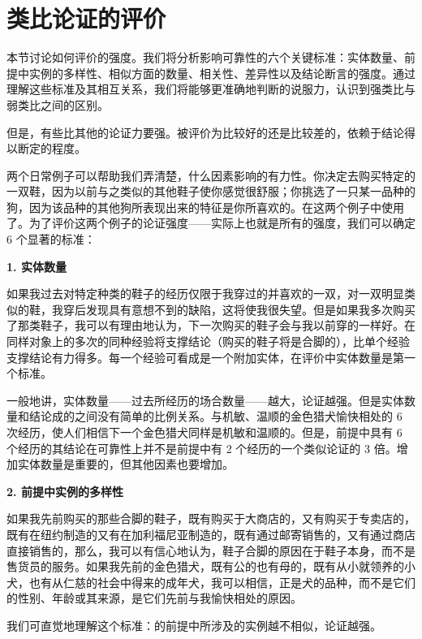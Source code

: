 \section{类比论证的评价}

\begin{logicbox}[title=引言]
本节讨论如何评价的强度。我们将分析影响可靠性的六个关键标准：实体数量、前提中实例的多样性、相似方面的数量、相关性、差异性以及结论断言的强度。通过理解这些标准及其相互关系，我们将能够更准确地判断的说服力，认识到强类比与弱类比之间的区别。
\end{logicbox}

但是，有些比其他的论证力要强。被评价为比较好的还是比较差的，依赖于结论得以断定的程度。

\begin{examplebox}[title=日常类比推理实例]
两个日常例子可以帮助我们弄清楚，什么因素影响的有力性。你决定去购买特定的一双鞋，因为以前与之类似的其他鞋子使你感觉很舒服；你挑选了一只某一品种的狗，因为该品种的其他狗所表现出来的特征是你所喜欢的。在这两个例子中使用了。为了评价这两个例子的论证强度——实际上也就是所有的强度，我们可以确定 6 个显著的标准：
\end{examplebox}

\begin{theorembox}[title=类比论证评价的六个标准]

\textbf{1. 实体数量}

如果我过去对特定种类的鞋子的经历仅限于我穿过的并喜欢的一双，对一双明显类似的鞋，我穿后发现具有意想不到的缺陷，这将使我很失望。但是如果我多次购买了那类鞋子，我可以有理由地认为，下一次购买的鞋子会与我以前穿的一样好。在同样对象上的多次的同种经验将支撑结论（购买的鞋子将是合脚的），比单个经验支撑结论有力得多。每一个经验可看成是一个附加实体，在评价中实体数量是第一个标准。

一般地讲，实体数量——过去所经历的场合数量——越大，论证越强。但是实体数量和结论成的之间没有简单的比例关系。与机敏、温顺的金色猎犬愉快相处的 6 次经历，使人们相信下一个金色猎犬同样是机敏和温顺的。但是，前提中具有 6 个经历的其结论在可靠性上并不是前提中有 2 个经历的一个类似论证的 3 倍。增加实体数量是重要的，但其他因素也要增加。

\textbf{2. 前提中实例的多样性}

如果我先前购买的那些合脚的鞋子，既有购买于大商店的，又有购买于专卖店的，既有在纽约制造的又有在加利福尼亚制造的，既有通过邮寄销售的，又有通过商店直接销售的，那么，我可以有信心地认为，鞋子合脚的原因在于鞋子本身，而不是售货员的服务。如果我先前的金色猎犬，既有公的也有母的，既有从小就领养的小犬，也有从仁慈的社会中得来的成年犬，我可以相信，正是犬的品种，而不是它们的性别、年龄或其来源，是它们先前与我愉快相处的原因。

我们可直觉地理解这个标准：的前提中所涉及的实例越不相似，论证越强。
\end{theorembox}

